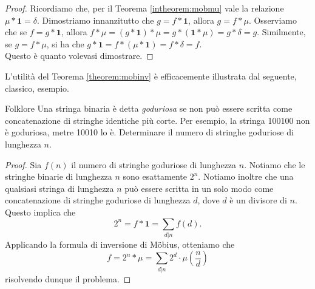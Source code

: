 \documentclass{article}
\begin{document}
\begin{proof}
	Ricordiamo che, per il Teorema \ref{intheorem:mobmu} vale la relazione
	$\mu\ast\textbf{1}=\delta$.
	Dimostriamo innanzitutto che $g=f\ast\textbf{1}$, allora $g=f\ast \mu$.
	Osserviamo che se $f=g\ast\textbf{1}$, allora
	$f\ast\mu=(g\ast\textbf{1})\ast\mu=g\ast(\textbf{1}\ast\mu)=g\ast\delta=g$.
	Similmente, se $g=f\ast\mu$, si ha che
	$g\ast\textbf{1}=f\ast(\mu\ast\textbf{1})=f\ast\delta=f$.\\ Questo è quanto
	volevasi dimostrare.
\end{proof}

L'utilità del Teorema \ref{theorem:mobinv} è efficacemente illustrata dal
seguente, classico, esempio.

\begin{example}{Folklore}{}
	Una stringa binaria è detta \emph{goduriosa} se non può essere
	scritta come concatenazione di stringhe identiche più corte. Per esempio,
	la stringa 100100 non è goduriosa, metre 10010 lo è. Determinare il numero
	di stringhe goduriose di lunghezza $n$.
\end{example}
\begin{proof}
	Sia $f(n)$ il numero di stringhe goduriose di lunghezza $n$.
	Notiamo che le stringhe binarie di lunghezza $n$ sono esattamente $2^n$.
	Notiamo inoltre che una qualsiasi stringa di lunghezza $n$ può essere scritta
	in un solo modo come concatenazione di stringhe goduriose
	di lunghezza $d$, dove $d$ è un divisore di $n$. Questo implica che
	\begin{equation*}
		2^n=f\ast\textbf{1}=\sum_{d\vert n}f(d).
	\end{equation*}
	Applicando la formula di inversione di Möbius, otteniamo che
	\begin{equation*}
		f=2^n\ast\mu=\sum_{d\vert n}2^d\cdot\mu\left(\frac{n}{d}\right)
	\end{equation*}
	risolvendo dunque il problema.
\end{proof}
\end{document}
